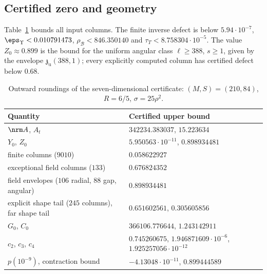 \subsection{Certified zero and geometry}\label{r7:sec-zero}
Table~\ref{r7:tab-bounds} bounds all input columns. The finite inverse defect is below $5.94\cdot10^{-7}$, $\eps_\Upsilon<0.010791473$, $\rho_{\mathcal B}<846.350140$ and $\tau_T<8.758304\cdot10^{-5}$.
The value $Z_0\approx0.899$ is the bound for the uniform angular class $\ell\geq388$, $s\geq1$, given by the envelope $\mathfrak z_{\mathrm u}(388,1)$; every explicitly computed column has certified defect below $0.68$.

\begin{table}[ht]
\centering\footnotesize
\begin{tabular}{@{}ll@{}}
\toprule
Quantity & Certified upper bound\\
\midrule
$\nrm A$, $A_t$ & $342234.383037$, $15.223634$\\
$Y_0$, $Z_0$ & $5.950563\cdot10^{-11}$, $0.898934481$\\
finite columns ($9010$) & $0.058622927$\\
exceptional field columns ($133$) & $0.676824352$\\
field envelopes ($106$ radial, $88$ gap, angular) & $0.898934481$\\
explicit shape tail ($245$ columns), far shape tail & $0.651602561$, $0.305605856$\\
$G_0$, $C_0$ & $366106.776644$, $1.243142911$\\
$c_2$, $c_3$, $c_4$ & $0.745260675$, $1.946871609\cdot10^{-6}$, $1.925257056\cdot10^{-12}$\\
$p(10^{-9})$, contraction bound & $-4.13048\cdot10^{-11}$, $0.899444589$\\
\bottomrule
\end{tabular}
\caption{Outward roundings of the seven-dimensional certificate: $(M,S)=(210,84)$, $R=6/5$, $\sigma=25\rho^2$.}\label{r7:tab-bounds}
\end{table}

